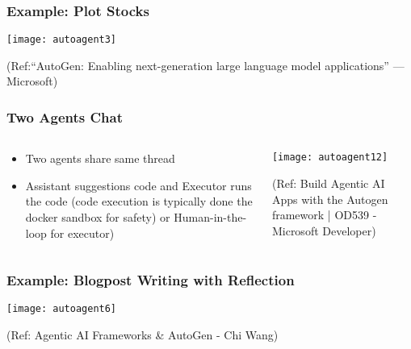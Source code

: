 \begin{frame}[fragile]\frametitle{Example: Plot Stocks}
	
	\begin{center}
	\texttt{[image: autoagent3]}
	\end{center}
	
{\tiny (Ref:``AutoGen: Enabling next-generation large language model applications'' — Microsoft)}
\end{frame}


\begin{frame}[fragile]\frametitle{Two Agents Chat}

\begin{columns}
    \begin{column}[T]{0.6\linewidth}

		  \begin{itemize}
		  \item Two agents share same thread
		  \item Assistant suggestions code and Executor runs the code (code execution is typically done the docker sandbox for safety) or Human-in-the-loop for executor)
		  \end{itemize}

    \end{column}
    \begin{column}[T]{0.4\linewidth}

		\begin{center}
		\texttt{[image: autoagent12]}
		\end{center}
	
	  {\tiny (Ref: Build Agentic AI Apps with the Autogen framework | OD539 - Microsoft Developer)}

    \end{column}
  \end{columns}
  
\end{frame}


 
\begin{frame}[fragile]\frametitle{Example: Blogpost Writing with Reflection}
		\begin{center}
		\texttt{[image: autoagent6]}
		\end{center}
		
		{\tiny (Ref: Agentic AI Frameworks \& AutoGen - Chi Wang)}
\end{frame}
  
